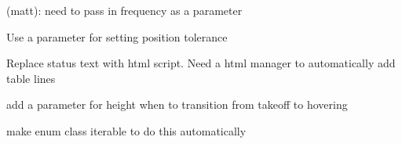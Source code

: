 \begin{DoxyRefList}
(matt)\-: need to pass in frequency as a parameter  
\item[\label{todo__todo000009}%
\hypertarget{todo__todo000009}{}%
Class \hyperlink{structPositionControlTransitionGuardFunctor__}{Position\-Control\-Transition\-Guard\-Functor\-\_\-$<$ Logic\-State\-Machine\-T $>$} ]Use a parameter for setting position tolerance 
\item[\label{todo__todo000013}%
\hypertarget{todo__todo000013}{}%
Member \hyperlink{classSystemStatusPublisher_a66f73a2e489face69d6f9fc16abb15aa}{System\-Status\-Publisher$<$ Logic\-State\-Machine\-T $>$\-:\-:publish\-System\-Status} ()]Replace status text with html script. Need a html manager to automatically add table lines  
\item[\label{todo__todo000010}%
\hypertarget{todo__todo000010}{}%
Member \hyperlink{structTakeoffInternalActionFunctor___a2118df6e326662cd0088344499e49696}{Takeoff\-Internal\-Action\-Functor\-\_\-$<$ Logic\-State\-Machine\-T $>$\-:\-:run} (\hyperlink{classUAVSystem}{U\-A\-V\-System} \&robot\-\_\-system, Logic\-State\-Machine\-T \&logic\-\_\-state\-\_\-machine)]add a parameter for height when to transition from takeoff to hovering 
\item[\label{todo__todo000012}%
\hypertarget{todo__todo000012}{}%
Member \hyperlink{classUAVSystem_a9218f794905e832cc356b5e4b659e1da}{U\-A\-V\-System\-:\-:U\-A\-V\-System} (parsernode\-::\-Parser \&drone\-\_\-hardware, U\-A\-V\-System\-Config config)]make enum class iterable to do this automatically 
\end{DoxyRefList}